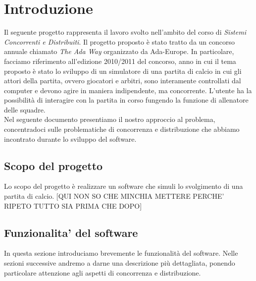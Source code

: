 
\section*{Introduzione}
%
\label{sec:introduzione}

Il seguente progetto rappresenta il lavoro svolto nell'ambito del corso di \emph{Sistemi Concorrenti e Distribuiti}. Il progetto proposto è stato tratto da un concorso annuale chiamato \emph{The Ada Way} organizzato da Ada-Europe. In particolare, facciamo riferimento all'edizione 2010/2011 del concorso, anno in cui il tema proposto è stato lo sviluppo di un simulatore di una partita di calcio in cui gli attori della partita, ovvero giocatori e arbitri, sono interamente controllati dal computer e devono agire in maniera indipendente, ma concorrente. L'utente ha la possibilità di interagire con la partita in corso fungendo la funzione di allenatore delle squadre. \\
Nel seguente documento presentiamo il nostro approccio al problema, concentradoci sulle problematiche di concorrenza e distribuzione che abbiamo incontrato durante lo sviluppo del software.

\subsection*{Scopo del progetto}
%
\label{sec:scopo_del_progetto}
Lo scopo del progetto è realizzare un software che simuli lo svolgimento di una partita di calcio.  [QUI NON SO CHE MINCHIA METTERE PERCHE' RIPETO TUTTO SIA PRIMA CHE DOPO]

\subsection*{Funzionalita' del software}
%
\label{sec:funzionalita_del_software}

In questa sezione introduciamo brevemente le funzionalità del software. Nelle sezioni successive andremo a darne una descrizione più dettagliata, ponendo particolare attenzione agli aspetti di concorrenza e distribuzione.

